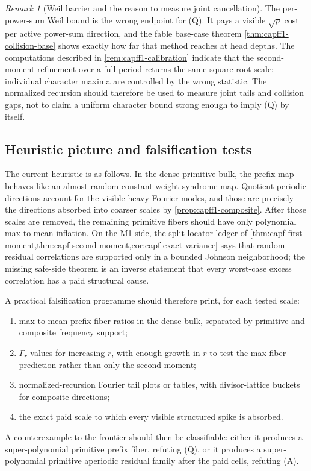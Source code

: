 \documentclass[11pt]{article}
\theoremstyle{definition}
\theoremstyle{remark}
\newtheorem{remark}[remark]{Remark}
\begin{document}
\begin{remark}[Weil barrier and the reason to measure joint cancellation]\label{rem:capfpr-weil-barrier}
The per-power-sum Weil bound is the wrong endpoint for \textup{(Q)}.  It pays a visible $\sqrt p$ cost per active power-sum direction, and the fable base-case theorem \cref{thm:capff1-collision-base} shows exactly how far that method reaches at head depths.  The computations described in \cref{rem:capff1-calibration} indicate that the second-moment refinement over a full period returns the same square-root scale: individual character maxima are controlled by the wrong statistic.  The normalized recursion should therefore be used to measure joint tails and collision gaps, not to claim a uniform character bound strong enough to imply \textup{(Q)} by itself.
\end{remark}

\subsection{Heuristic picture and falsification tests}\label{subsec:capfpr-heuristics}

The current heuristic is as follows.  In the dense primitive bulk, the prefix map behaves like an almost-random constant-weight syndrome map.  Quotient-periodic directions account for the visible heavy Fourier modes, and those are precisely the directions absorbed into coarser scales by \cref{prop:capff1-composite}.  After those scales are removed, the remaining primitive fibers should have only polynomial max-to-mean inflation.  On the M1 side, the split-locator ledger of \cref{thm:capf-first-moment,thm:capf-second-moment,cor:capf-exact-variance} says that random residual correlations are supported only in a bounded Johnson neighborhood; the missing safe-side theorem is an inverse statement that every worst-case excess correlation has a paid structural cause.

A practical falsification programme should therefore print, for each tested scale:
\begin{enumerate}[label=\textup{(\roman*)},leftmargin=2.4em]
\item max-to-mean prefix fiber ratios in the dense bulk, separated by primitive and composite frequency support;
\item $\Gamma_r$ values for increasing $r$, with enough growth in $r$ to test the max-fiber prediction rather than only the second moment;
\item normalized-recursion Fourier tail plots or tables, with divisor-lattice buckets for composite directions;
\item the exact paid scale to which every visible structured spike is absorbed.
\end{enumerate}
A counterexample to the frontier should then be classifiable: either it produces a super-polynomial primitive prefix fiber, refuting \textup{(Q)}, or it produces a super-polynomial primitive aperiodic residual family after the paid cells, refuting \textup{(A)}.
\end{document}
